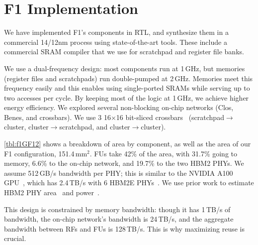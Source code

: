 \section{F1 Implementation}
\label{sec:f1implementation}

We have implemented F1's components in RTL,
and synthesize them in a commercial 14/12nm process using state-of-the-art tools.
These include a commercial SRAM compiler that we use for scratchpad and register file banks.

We use a dual-frequency design: most components run at 1\,GHz,
but memories (register files and scratchpads)
run double-pumped at 2\,GHz.
Memories meet this frequency easily and this enables using single-ported SRAMs while serving up to two accesses per cycle.
%
By keeping most of the logic at 1\,GHz, we achieve higher energy efficiency.
%
We explored several non-blocking on-chip networks (Clos, Benes, and crossbars).
We use 3 16$\times$16 bit-sliced crossbars~\cite{passas:tocaid12:crossbar} (scratch\-pad$\rightarrow$cluster, cluster$\rightarrow$scratchpad, and cluster$\rightarrow$cluster). %

\autoref{tbl:f1GF12} shows a breakdown of area by component, as well as the area of our F1 configuration,
151.4\,mm$^2$.
FUs take 42\% of the area, with 31.7\% going to memory,
6.6\% to the on-chip network, and 19.7\% to the two HBM2 PHYs.
We assume 512\,GB/s bandwidth per PHY;
this is similar to the NVIDIA A100 GPU~\cite{choquette2021nvidia}, which has 2.4\,TB/s with 6 HBM2E PHYs~\cite{nvidiadgx}.
We use prior work to estimate HBM2 PHY area~\cite{rambuswhite, dasgupta20208} and power~\cite{rambuswhite, ge2011design}.

This design is constrained by memory bandwidth: though it has 1\,TB/s of bandwidth,
the on-chip network's bandwidth is 24\,TB/s, and the aggregate bandwidth between RFs and FUs is 128\,TB/s.
This is why maximizing reuse is crucial.

